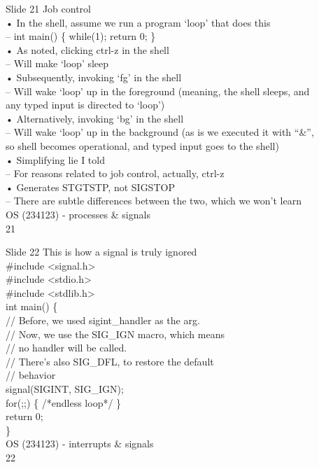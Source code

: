 \documentclass{beamer}
\begin{document}
\begin{frame}{Slide 21}
Job control\\• In the shell, assume we run a program ‘loop’ that does this\\– int main() \{ while(1); return 0; \}\\• As noted, clicking ctrl-z in the shell\\– Will make ‘loop’ sleep\\• Subsequently, invoking ‘fg’ in the shell\\– Will wake ‘loop’ up in the foreground (meaning, the shell sleeps, and \\any typed input is directed to ‘loop’)\\• Alternatively, invoking ‘bg’ in the shell\\– Will wake ‘loop’ up in the background (as is we executed it with “\&”, \\so shell becomes operational, and typed input goes to the shell)\\• Simplifying lie I told\\– For reasons related to job control, actually, ctrl-z \\• Generates STGTSTP, not SIGSTOP\\– There are subtle differences between the two, which we won’t learn\\OS (234123) - processes \& signals\\21
\end{frame}
\begin{frame}{Slide 22}
This is how a signal is truly ignored\\\#include <signal.h>\\\#include <stdio.h>\\\#include <stdlib.h>\\int main() \{\\    // Before, we used sigint\_handler as the arg.\\    // Now, we use the SIG\_IGN macro, which means\\    // no handler will be called. \\    // There’s also SIG\_DFL, to restore the default\\    // behavior\\    signal(SIGINT, SIG\_IGN); \\    for(;;) \{ /*endless loop*/ \}\\    return 0;\\\}\\OS (234123) - interrupts \& signals\\22
\end{frame}
\end{document}
